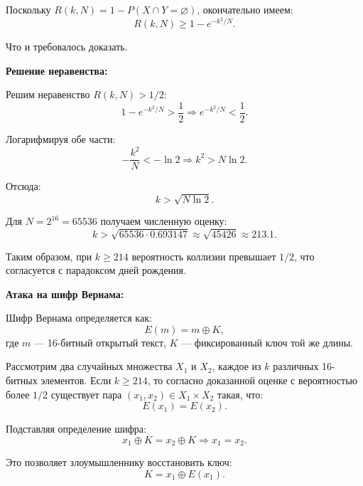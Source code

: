 \documentclass[a4paper]{article}
\theoremstyle{definition}
\begin{document}
Поскольку $R(k, N) = 1 - P(X \cap Y = \varnothing)$, окончательно имеем:
\begin{equation}
    R(k, N) \ge 1 - e^{-k^2/N}.
\end{equation}

Что и требовалось доказать.

\textbf{Решение неравенства:}

Решим неравенство $R(k, N) > 1/2$:
\begin{equation}
    1 - e^{-k^2/N} > \frac{1}{2} \Rightarrow e^{-k^2/N} < \frac{1}{2}.
\end{equation}

Логарифмируя обе части:
\begin{equation}
    -\frac{k^2}{N} < -\ln 2 \Rightarrow k^2 > N \ln 2.
\end{equation}

Отсюда:
\begin{equation}
    k > \sqrt{N \ln 2}.
\end{equation}

Для $N = 2^{16} = 65536$ получаем численную оценку:
\begin{equation}
    k > \sqrt{65536 \cdot 0.693147} \approx \sqrt{45426} \approx 213.1.
\end{equation}

Таким образом, при $k \ge 214$ вероятность коллизии превышает $1/2$, что согласуется с парадоксом дней рождения.

\textbf{Атака на шифр Вернама:}

Шифр Вернама определяется как:
\begin{equation}
    E(m) = m \oplus K,
\end{equation}
где $m$ — 16-битный открытый текст, $K$ — фиксированный ключ той же длины.

Рассмотрим два случайных множества $X_1$ и $X_2$, каждое из $k$ различных 16-битных элементов. Если $k \ge 214$, то согласно доказанной оценке с вероятностью более $1/2$ существует пара $(x_1, x_2) \in X_1 \times X_2$ такая, что:
\begin{equation}
    E(x_1) = E(x_2).
\end{equation}

Подставляя определение шифра:
\begin{equation}
    x_1 \oplus K = x_2 \oplus K \Rightarrow x_1 = x_2.
\end{equation}

Это позволяет злоумышленнику восстановить ключ:
\begin{equation}
    K = x_1 \oplus E(x_1).
\end{equation}
\end{document}
